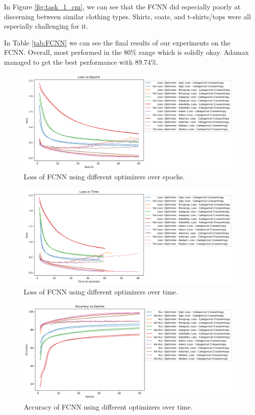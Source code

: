 \documentclass[12pt]{article}
\begin{document}
In Figure \ref{fig:task_1_cm}, we can see that the FCNN did especially poorly
 at discerning between similar clothing types.
Shirts, coats, and t-shirts/tops were all especially challenging for it.

In Table \ref{tab:FCNN} we can see the final results of our experiments on the FCNN.
Overall, most performed in the 80\% range which is solidly okay.
Adamax managed to get the best performance with 89.74\%.

\begin{figure}
  \centering
  \includegraphics[width=\linewidth]{task_1_loss_epochs.png}
  \caption{Loss of FCNN using different optimizers over epochs.}
  \label{fig:task_1_loss_epochs}
\end{figure}

\begin{figure}
  \centering
  \includegraphics[width=\linewidth]{task_1_loss_time.png}
  \caption{Loss of FCNN using different optimizers over time.}
  \label{fig:task_1_loss_time}
\end{figure}

\begin{figure}
  \centering
  \includegraphics[width=\linewidth]{task_1_acc_epochs.png}
  \caption{Accuracy of FCNN using different optimizers over time.}
  \label{fig:task_1_acc_epochs}
\end{figure}
\end{document}
